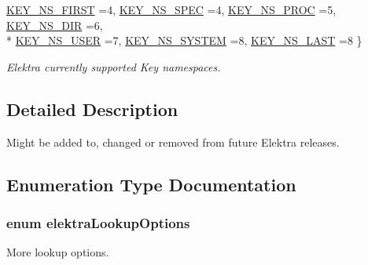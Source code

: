 \begin{DoxyCompactItemize}
$$\hyperlink{group__proposal_ggaec3b8d6f430ae49b91bafe8a86310a68ae06281f94c2b7a221115afbaa1e0ff45}{K\-E\-Y\-\_\-\-N\-S\-\_\-\-F\-I\-R\-S\-T} =4, 
\hyperlink{group__proposal_ggaec3b8d6f430ae49b91bafe8a86310a68a2be047b124b1ca0e92b5ef124169f0d2}{K\-E\-Y\-\_\-\-N\-S\-\_\-\-S\-P\-E\-C} =4, 
\hyperlink{group__proposal_ggaec3b8d6f430ae49b91bafe8a86310a68a470ecc9254fcdfccf9923a3e526c9c11}{K\-E\-Y\-\_\-\-N\-S\-\_\-\-P\-R\-O\-C} =5, 
\hyperlink{group__proposal_ggaec3b8d6f430ae49b91bafe8a86310a68aa0006cf27dbb2586bafba6ff1ae4f4ec}{K\-E\-Y\-\_\-\-N\-S\-\_\-\-D\-I\-R} =6, 
\\*
\hyperlink{group__proposal_ggaec3b8d6f430ae49b91bafe8a86310a68a8ce23c70010e8ac8bb540b0947e03a4e}{K\-E\-Y\-\_\-\-N\-S\-\_\-\-U\-S\-E\-R} =7, 
\hyperlink{group__proposal_ggaec3b8d6f430ae49b91bafe8a86310a68a61adca2f9dff47e65dfcdb492ffa7a20}{K\-E\-Y\-\_\-\-N\-S\-\_\-\-S\-Y\-S\-T\-E\-M} =8, 
\hyperlink{group__proposal_ggaec3b8d6f430ae49b91bafe8a86310a68ad4d0f219a657517ddd50cd06c8190310}{K\-E\-Y\-\_\-\-N\-S\-\_\-\-L\-A\-S\-T} =8
 \}
\begin{DoxyCompactList}\small\item\em Elektra currently supported Key namespaces. \end{DoxyCompactList}\end{DoxyCompactItemize}


\subsection{Detailed Description}
Might be added to, changed or removed from future Elektra releases. 

\subsection{Enumeration Type Documentation}
\hypertarget{group__proposal_ga93673533c4c8eb1fdfca76b98c5f49b0}{
\subsubsection[{elektra\-Lookup\-Options}]{\setlength{\rightskip}{0pt plus 5cm}enum {\bf elektra\-Lookup\-Options}}}\label{group__proposal_ga93673533c4c8eb1fdfca76b98c5f49b0}


More lookup options. 

